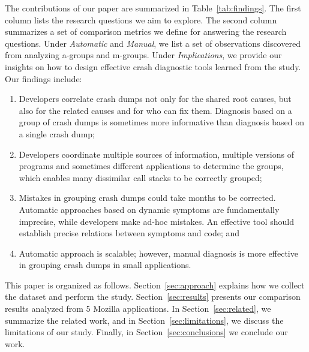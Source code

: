 The contributions of our paper are summarized in Table~\ref{tab:findings}. The first column lists the research questions we aim to explore. The second column summarizes a set of comparison metrics we define for answering the research questions. Under {\it Automatic} and {\it Manual}, we list a set of observations discovered from analyzing a-groups and m-groups. Under {\it Implications}, we provide our insights on how to design effective crash diagnostic tools learned from the study. Our findings include:

\begin{enumerate}
\item Developers correlate crash dumps not only for the shared root causes, but also for the related causes and for who can fix them. Diagnosis based on a group of crash dumps is sometimes more informative than diagnosis based on a single crash dump;
\item Developers coordinate multiple sources of information, multiple versions of programs and sometimes different applications to determine the groups, which enables many dissimilar call stacks to be correctly grouped; 
\item Mistakes in grouping crash dumps could take months to be corrected. Automatic approaches based on dynamic symptoms are fundamentally imprecise, while developers make ad-hoc mistakes. An effective tool should establish precise relations between symptoms and code; and
\item Automatic approach is scalable; however, manual diagnosis is more effective in grouping crash dumps in small applications. 
\end{enumerate}


This paper is organized as follows. Section~\ref{sec:approach} explains how we collect the dataset and perform the study. Section~\ref{sec:results} presents our comparison results analyzed from 5 Mozilla applications. In Section~\ref{sec:related}, we summarize the related work, and in Section~\ref{sec:limitations}, we discuss the limitations of our study. Finally, in Section~\ref{sec:conclusions} we conclude our work.


 